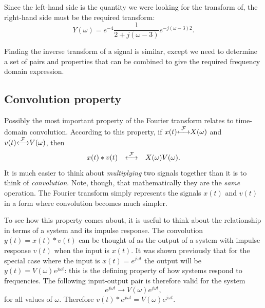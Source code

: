 \documentclass[10pt]{beamer}
\newcommand{\conv}{\ast}
\newcommand{\ftpair}{{\stackrel{\cal F}{\longleftrightarrow}}}
\begin{document}
Since the left-hand side is the quantity we were looking for the transform of, the right-hand side must be the required transform:
\begin{equation*}
  Y(\omega) = e^{-4} \frac{1}{2 + j (\omega-3)} e^{-j (\omega-3) 2}.
\end{equation*}

Finding the inverse transform of a signal is similar, except we need to determine a set of pairs and properties that can be combined to give the required frequency domain expression.

\subsection{Convolution property}

Possibly the most important property of the Fourier transform relates to time-domain convolution.  According to this property, if $x(t) \ftpair X(\omega)$ and $v(t) \ftpair V(\omega)$, then
\begin{equation*}
  x(t) \conv v(t) \quad \ftpair \quad X(\omega) V(\omega).
\end{equation*}
It is much easier to think about {\em multiplying} two signals together than it is to think of {\em convolution}.  Note, though, that mathematically they are the {\em same} operation.  The Fourier transform simply represents the signals $x(t)$ and $v(t)$ in a form where convolution becomes much simpler.

To see how this property comes about, it is useful to think about the relationship in terms of a system and its impulse response.  The convolution $y(t) = x(t) \conv v(t)$ can be thought of as the output of a system with impulse response $v(t)$ when the input is $x(t)$.  It was shown previously that for the special case where the input is $x(t) = e^{j \omega t}$ the output will be $y(t) = V(\omega) e^{j \omega t}$:  this is the defining property of how systems respond to frequencies.  The following input-output pair is therefore valid for the system
\begin{equation*}
  e^{j \omega t} \longrightarrow V(\omega) e^{j \omega t},
\end{equation*}
for all values of $\omega$.  Therefore $v(t) \conv e^{j \omega t} = V(\omega) e^{j \omega t}$.
\end{document}

